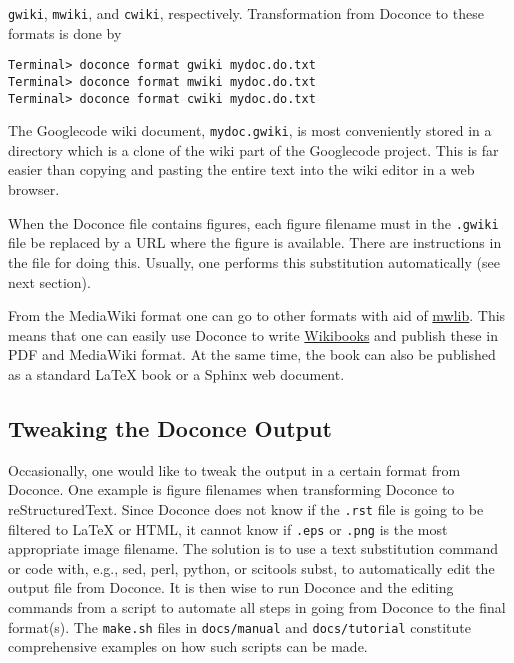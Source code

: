 \documentclass[%
oneside,                 %
final,                   %
10pt]{article}
\begin{document}
{\fontsize{10pt}{10pt}\Verb!gwiki!}, {\fontsize{10pt}{10pt}\Verb!mwiki!}, and {\fontsize{10pt}{10pt}\Verb!cwiki!}, respectively.
Transformation from Doconce to these formats is done by
\vspace{4pt}
\begin{Verbatim}[numbers=none,frame=lines,label=\fbox{{\tiny Terminal}},fontsize=\fontsize{9pt}{9pt},
labelposition=topline,framesep=2.5mm,framerule=0.7pt]
Terminal> doconce format gwiki mydoc.do.txt
Terminal> doconce format mwiki mydoc.do.txt
Terminal> doconce format cwiki mydoc.do.txt
\end{Verbatim}

The Googlecode wiki document, {\fontsize{10pt}{10pt}\Verb!mydoc.gwiki!}, is most conveniently stored
in a directory which is a clone of the wiki part of the Googlecode project.
This is far easier than copying and pasting the entire text into the
wiki editor in a web browser.

When the Doconce file contains figures, each figure filename must in
the {\fontsize{10pt}{10pt}\Verb!.gwiki!} file be replaced by a URL where the figure is
available. There are instructions in the file for doing this. Usually,
one performs this substitution automatically (see next section).

From the MediaWiki format one can go to other formats with aid
of \href{{http://pediapress.com/code/}}{mwlib}. This means that one can
easily use Doconce to write \href{{http://en.wikibooks.org}}{Wikibooks}
and publish these in PDF and MediaWiki format.
At the same time, the book can also be published as a
standard {\LaTeX} book or a Sphinx web document.

\subsection{Tweaking the Doconce Output}

Occasionally, one would like to tweak the output in a certain format
from Doconce. One example is figure filenames when transforming
Doconce to reStructuredText. Since Doconce does not know if the
{\fontsize{10pt}{10pt}\Verb!.rst!} file is going to be filtered to {\LaTeX} or HTML, it cannot know
if {\fontsize{10pt}{10pt}\Verb!.eps!} or {\fontsize{10pt}{10pt}\Verb!.png!} is the most appropriate image filename.
The solution is to use a text substitution command or code with, e.g., sed,
perl, python, or scitools subst, to automatically edit the output file
from Doconce. It is then wise to run Doconce and the editing commands
from a script to automate all steps in going from Doconce to the final
format(s). The {\fontsize{10pt}{10pt}\Verb!make.sh!} files in {\fontsize{10pt}{10pt}\Verb!docs/manual!} and {\fontsize{10pt}{10pt}\Verb!docs/tutorial!}
constitute comprehensive examples on how such scripts can be made.
\end{document}
